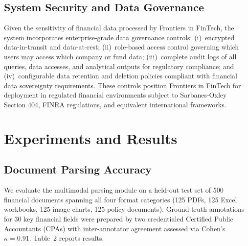 \documentclass[12pt,letterpaper]{article}
\begin{document}
\subsection{System Security and Data Governance}

Given the sensitivity of financial data processed by Frontiers in FinTech,
the system incorporates enterprise-grade data governance controls:
(i)~encrypted data-in-transit and data-at-rest; (ii)~role-based access
control governing which users may access which company or fund data;
(iii)~complete audit logs of all queries, data accesses, and analytical
outputs for regulatory compliance; and (iv)~configurable data retention
and deletion policies compliant with financial data sovereignty
requirements.
These controls position Frontiers in FinTech for deployment in regulated financial
environments subject to Sarbanes-Oxley Section 404, FINRA regulations,
and equivalent international frameworks.

\section{Experiments and Results}
\label{sec:evaluation}

\subsection{Document Parsing Accuracy}

We evaluate the multimodal parsing module on a held-out test set of
500 financial documents spanning all four format categories
(125 PDFs, 125 Excel workbooks, 125 image charts, 125 policy
documents).
Ground-truth annotations for 30 key financial fields were prepared
by two credentialed Certified Public Accountants (CPAs) with
inter-annotator agreement assessed via Cohen's $\kappa = 0.91$.
Table~2 reports results.
\end{document}
